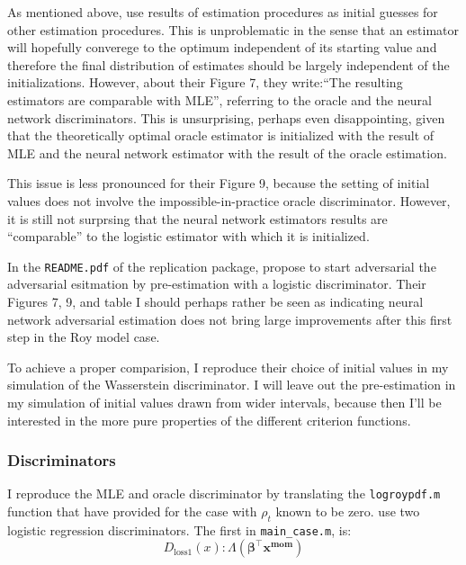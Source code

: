 As mentioned above, \textcite{kaji2023adversarial} use results of estimation procedures as initial guesses for other estimation procedures.
This is unproblematic in the sense that an estimator will hopefully converege to the optimum independent of its starting value and therefore the final distribution of estimates should be largely independent of the initializations.
However, about their Figure 7, they write:``The resulting estimators are comparable with MLE'', referring to the oracle and the neural network discriminators.
This is unsurprising, perhaps even disappointing, given that the theoretically optimal oracle estimator is initialized with the result of MLE and the neural network estimator with the result of the oracle estimation.

This issue is less pronounced for their Figure 9, because the setting of initial values does not involve the impossible-in-practice oracle discriminator.
However, it is still not surprsing that the neural network estimators results are ``comparable'' to the logistic estimator with which it is initialized.

In the \texttt{README.pdf} of the replication package, \Textcite{kaji2023adversarial} propose to start adversarial the adversarial esitmation by pre-estimation with a logistic discriminator.
Their Figures 7, 9, and table I should perhaps rather be seen as indicating neural network adversarial estimation does not bring large improvements after this first step in the Roy model case.

To achieve a proper comparision, I reproduce their choice of initial values in my simulation of the Wasserstein discriminator.
I will leave out the pre-estimation in my simulation of initial values drawn from wider intervals, because then I'll be interested in the more pure properties of the different criterion functions.

\subsubsection{Discriminators}

I reproduce the MLE and oracle discriminator by translating the \texttt{logroypdf.m} function that \textcite{kaji2023adversarial} have provided for the case with $\rho_t$ known to be zero.
\textcite{kaji2023adversarial} use two logistic regression discriminators. The first in \texttt{main\_case.m}, is:
\begin{equation}
    D_{\text{loss1}}(x) : \Lambda(\mathbf{\beta}^{\intercal} \mathbf{x^{mom}}) %
\end{equation}

